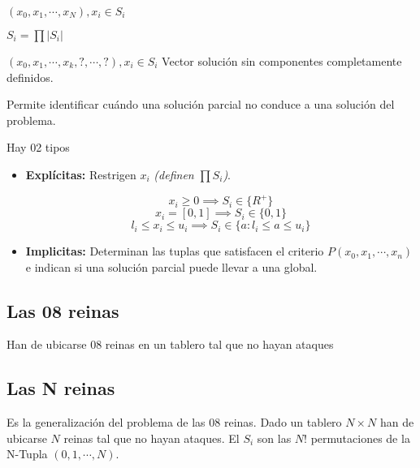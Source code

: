 \documentclass[tikz,11pt,fleqn]{book} %
\begin{document}
\begin{definition}[Solución]
	$(x_0, x_1, \cdots,x_N),x_i\in S_i$\end{definition}

\begin{definition}
	$S_i=\prod|S_i|$\end{definition}

\begin{definition}
	$(x_0, x_1, \cdots,x_k,?,\cdots,?),x_i\in S_i$
	Vector solución sin componentes completamente definidos.
\end{definition}

\begin{definition}
	Permite identificar cuándo una solución parcial no conduce a una solución del problema.
\end{definition}

\begin{definition}
	Hay 02 tipos
	\begin{itemize}
		\item \textbf{Explícitas:} Restrigen $x_i$ \textit{(definen $\prod S_i$)}.
		      \begin{example}
			      $$ x_i\ge0\implies S_i\in \{R^+\} $$
			      $$ x_i=[0,1]\implies S_i\in \{0,1\} $$
			      $$ l_i\le x_i\le u_i\implies S_i\in\{a:l_i\le a\le u_i\} $$
		      \end{example}
		\item \textbf{Implicitas:} Determinan las tuplas que satisfacen el criterio $P(x_0,x_1,\cdots,x_n)$ e indican si una solución parcial puede llevar a una global.
	\end{itemize}
\end{definition}


\subsection{Las 08 reinas}
Han de ubicarse 08 reinas en un tablero tal que no hayan ataques


\subsection{Las N reinas}
Es la generalización del problema de las 08 reinas. Dado un tablero $N\times N$ han de ubicarse $N$ reinas tal que no hayan ataques.
El $S_i$ son las $N!$ permutaciones de la N-Tupla $(0,1, \cdots,N)$.
\end{document}
